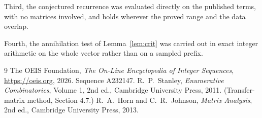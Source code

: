 \documentclass[11pt,a4paper]{article}
\theoremstyle{plain}
\theoremstyle{definition}
\begin{document}
Third, the conjectured recurrence was evaluated directly on the published terms, with no
matrices involved, and holds wherever the proved range and the data overlap.

Fourth, the annihilation test of Lemma~\ref{lem:crit} was carried out in exact integer
arithmetic on the whole vector rather than on a sampled prefix.

\begin{thebibliography}{9}
 The OEIS Foundation, \emph{The On-Line Encyclopedia of Integer
Sequences}, \url{https://oeis.org}, 2026. Sequence A232147.
 R.~P.~Stanley, \emph{Enumerative Combinatorics}, Volume 1, 2nd ed.,
Cambridge University Press, 2011. (Transfer-matrix method, Section 4.7.)
 R.~A.~Horn and C.~R.~Johnson, \emph{Matrix Analysis}, 2nd ed., Cambridge
University Press, 2013.
\end{thebibliography}
\end{document}
